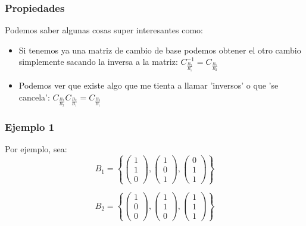 \documentclass[12pt]{article}							    %
\begin{document}
\subsubsection{Propiedades}
Podemos saber algunas cosas super interesantes como:
\begin{itemize}
    \item Si tenemos ya una matriz de cambio de base podemos obtener el otro cambio simplemente sacando la inversa a la matriz:
    $ C^{-1}_{\frac{B_2}{B_1}} = C_{\frac{B_1}{B_2}} $
    
    \item Podemos ver que existe algo que me tienta a llamar 'inversos' o que 'se cancela': 
    $ C_{\frac{B_3}{B_2}} C_{\frac{B_2}{B_1}} = C_{\frac{B_3}{B_1}} $

\end{itemize}

\subsubsection{Ejemplo 1}

Por ejemplo, sea:
\begin{equation*}
    B_1 = \left\{
        \begin{pmatrix} 1 \\ 1 \\0 \end{pmatrix}, \begin{pmatrix} 1 \\ 0 \\1 \end{pmatrix},
        \begin{pmatrix} 0 \\ 1 \\1 \end{pmatrix}
    \right\}
\end{equation*}

\begin{equation*}
    B_2 = \left\{
        \begin{pmatrix} 1 \\ 0 \\0 \end{pmatrix}, \begin{pmatrix} 1 \\ 1 \\0 \end{pmatrix},
        \begin{pmatrix} 1 \\ 1 \\1 \end{pmatrix}
    \right\}
\end{equation*}
\end{document}
